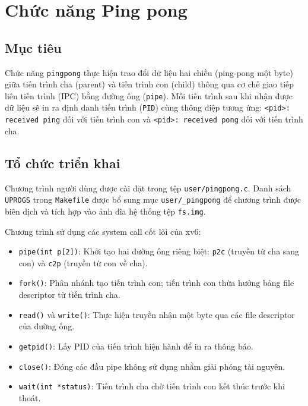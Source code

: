\section{Chức năng Ping pong}

\subsection{Mục tiêu}
Chức năng \texttt{pingpong} thực hiện trao đổi dữ liệu hai chiều (ping-pong một byte) giữa tiến trình cha (parent) và tiến trình con (child) thông qua cơ chế giao tiếp liên tiến trình (IPC) bằng đường ống (\texttt{pipe}). Mỗi tiến trình sau khi nhận được dữ liệu sẽ in ra định danh tiến trình (\texttt{PID}) cùng thông điệp tương ứng: \texttt{<pid>: received ping} đối với tiến trình con và \texttt{<pid>: received pong} đối với tiến trình cha.

\subsection{Tổ chức triển khai}
Chương trình người dùng được cài đặt trong tệp \texttt{user/pingpong.c}. Danh sách \texttt{UPROGS} trong \texttt{Makefile} được bổ sung mục \texttt{user/\_pingpong} để chương trình được biên dịch và tích hợp vào ảnh đĩa hệ thống tệp \texttt{fs.img}.

Chương trình sử dụng các system call cốt lõi của xv6:
\begin{itemize}
  \item \texttt{pipe(int p[2])}: Khởi tạo hai đường ống riêng biệt: \texttt{p2c} (truyền từ cha sang con) và \texttt{c2p} (truyền từ con về cha).
  \item \texttt{fork()}: Phân nhánh tạo tiến trình con; tiến trình con thừa hưởng bảng file descriptor từ tiến trình cha.
  \item \texttt{read()} và \texttt{write()}: Thực hiện truyền nhận một byte qua các file descriptor của đường ống.
  \item \texttt{getpid()}: Lấy PID của tiến trình hiện hành để in ra thông báo.
  \item \texttt{close()}: Đóng các đầu pipe không sử dụng nhằm giải phóng tài nguyên.
  \item \texttt{wait(int *status)}: Tiến trình cha chờ tiến trình con kết thúc trước khi thoát.
\end{itemize}

